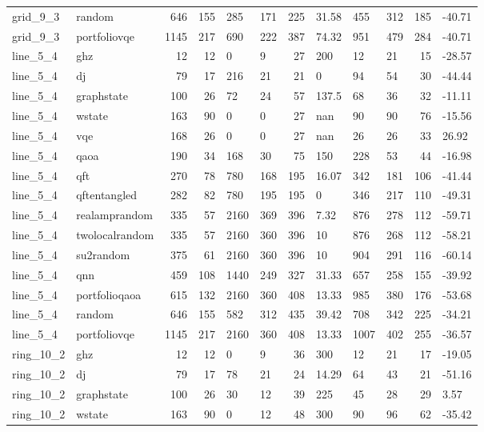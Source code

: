 \begin{longtable}{llrrllrlllrl}
grid\_9\_3 & random & 646 & 155 & 285 & 171 & 225 & 31.58 & 455 & 312 & 185 & -40.71 \\
grid\_9\_3 & portfoliovqe & 1145 & 217 & 690 & 222 & 387 & 74.32 & 951 & 479 & 284 & -40.71 \\
line\_5\_4 & ghz & 12 & 12 & 0 & 9 & 27 & 200 & 12 & 21 & 15 & -28.57 \\
line\_5\_4 & dj & 79 & 17 & 216 & 21 & 21 & 0 & 94 & 54 & 30 & -44.44 \\
line\_5\_4 & graphstate & 100 & 26 & 72 & 24 & 57 & 137.5 & 68 & 36 & 32 & -11.11 \\
line\_5\_4 & wstate & 163 & 90 & 0 & 0 & 27 & nan & 90 & 90 & 76 & -15.56 \\
line\_5\_4 & vqe & 168 & 26 & 0 & 0 & 27 & nan & 26 & 26 & 33 & 26.92 \\
line\_5\_4 & qaoa & 190 & 34 & 168 & 30 & 75 & 150 & 228 & 53 & 44 & -16.98 \\
line\_5\_4 & qft & 270 & 78 & 780 & 168 & 195 & 16.07 & 342 & 181 & 106 & -41.44 \\
line\_5\_4 & qftentangled & 282 & 82 & 780 & 195 & 195 & 0 & 346 & 217 & 110 & -49.31 \\
line\_5\_4 & realamprandom & 335 & 57 & 2160 & 369 & 396 & 7.32 & 876 & 278 & 112 & -59.71 \\
line\_5\_4 & twolocalrandom & 335 & 57 & 2160 & 360 & 396 & 10 & 876 & 268 & 112 & -58.21 \\
line\_5\_4 & su2random & 375 & 61 & 2160 & 360 & 396 & 10 & 904 & 291 & 116 & -60.14 \\
line\_5\_4 & qnn & 459 & 108 & 1440 & 249 & 327 & 31.33 & 657 & 258 & 155 & -39.92 \\
line\_5\_4 & portfolioqaoa & 615 & 132 & 2160 & 360 & 408 & 13.33 & 985 & 380 & 176 & -53.68 \\
line\_5\_4 & random & 646 & 155 & 582 & 312 & 435 & 39.42 & 708 & 342 & 225 & -34.21 \\
line\_5\_4 & portfoliovqe & 1145 & 217 & 2160 & 360 & 408 & 13.33 & 1007 & 402 & 255 & -36.57 \\
ring\_10\_2 & ghz & 12 & 12 & 0 & 9 & 36 & 300 & 12 & 21 & 17 & -19.05 \\
ring\_10\_2 & dj & 79 & 17 & 78 & 21 & 24 & 14.29 & 64 & 43 & 21 & -51.16 \\
ring\_10\_2 & graphstate & 100 & 26 & 30 & 12 & 39 & 225 & 45 & 28 & 29 & 3.57 \\
ring\_10\_2 & wstate & 163 & 90 & 0 & 12 & 48 & 300 & 90 & 96 & 62 & -35.42 \\

\end{longtable}
